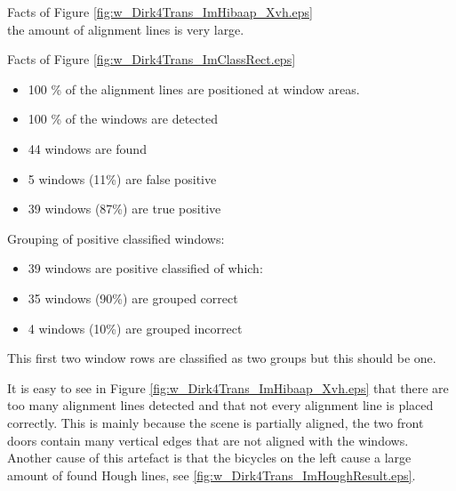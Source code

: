 Facts of Figure \ref{fig:w_Dirk4Trans_ImHibaap_Xvh.eps}\\
the amount of alignment lines is very large.

Facts of Figure \ref{fig:w_Dirk4Trans_ImClassRect.eps}\\
\begin{itemize}
	\item 100 \% of the alignment lines are positioned at window areas.
	\item 100 \% of the windows are detected
	\item 44 windows are found
	\item 5 windows (11\%) are false positive
	\item 39 windows (87\%) are true positive
\end{itemize}

Grouping of positive classified windows:\\
\begin{itemize}
	\item 39 windows are positive classified of which:
	\item 35 windows (90\%) are grouped correct
	\item 4 windows (10\%) are grouped incorrect
\end{itemize}



This first two window rows are classified as two groups but this should be one.\\













It is easy to see in Figure \ref{fig:w_Dirk4Trans_ImHibaap_Xvh.eps} that there are 
too many alignment lines detected and that not every alignment line is placed correctly. 
This is mainly because the scene is partially aligned, the two
front doors contain many vertical edges that are not aligned with the windows.
Another cause of this artefact is that the bicycles on the left cause a large
amount of found Hough lines, see \ref{fig:w_Dirk4Trans_ImHoughResult.eps}.
 


